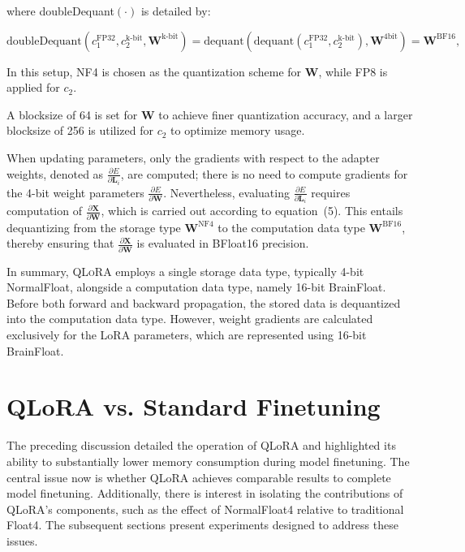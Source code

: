 where doubleDequant$(\cdot)$ is detailed by:

\begin{equation}
    \text{doubleDequant}(c_1^{\text{FP32}}, c_2^{\text{k-bit}}, \mathbf{W}^{\text{k-bit}}) = \text{dequant}(\text{dequant}(c_1^{\text{FP32}}, c_2^{\text{k-bit}}), \mathbf{W}^{\text{4bit}}) = \mathbf{W}^{\text{BF16}},
\end{equation}

In this setup, NF4 is chosen as the quantization scheme for $\mathbf{W}$, while FP8 is applied for $c_2$.

A blocksize of 64 is set for $\mathbf{W}$ to achieve finer quantization accuracy, and a larger blocksize of 256 is utilized for $c_2$ to optimize memory usage.

When updating parameters, only the gradients with respect to the adapter weights, denoted as $\frac{\partial E}{\partial \mathbf{L}_i}$, are computed; there is no need to compute gradients for the 4-bit weight parameters $\frac{\partial E}{\partial \mathbf{W}}$. Nevertheless, evaluating $\frac{\partial E}{\partial \mathbf{L}_i}$ requires computation of $\frac{\partial \mathbf{X}}{\partial \mathbf{W}}$, which is carried out according to equation~(5). This entails dequantizing from the storage type $\mathbf{W}^{\text{NF4}}$ to the computation data type $\mathbf{W}^{\text{BF16}}$, thereby ensuring that $\frac{\partial \mathbf{X}}{\partial \mathbf{W}}$ is evaluated in BFloat16 precision.

In summary, \textsc{QLoRA} employs a single storage data type, typically 4-bit NormalFloat, alongside a computation data type, namely 16-bit BrainFloat. Before both forward and backward propagation, the stored data is dequantized into the computation data type. However, weight gradients are calculated exclusively for the LoRA parameters, which are represented using 16-bit BrainFloat.

\section{QLoRA vs. Standard Finetuning}
\label{sec:comp_to_std}

The preceding discussion detailed the operation of QLoRA and highlighted its ability to substantially lower memory consumption during model finetuning. The central issue now is whether QLoRA achieves comparable results to complete model finetuning. Additionally, there is interest in isolating the contributions of QLoRA’s components, such as the effect of NormalFloat4 relative to traditional Float4. The subsequent sections present experiments designed to address these issues.

